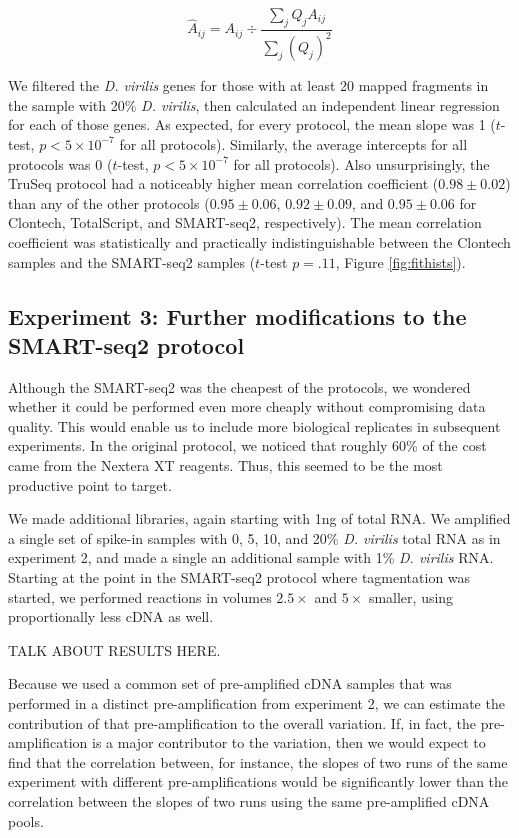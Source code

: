\begin{equation} \label{eqn:norm}
\hat{A}_{ij} = A_{ij} \div \frac{\sum_j Q_j A_{ij}}{\sum_j (Q_j)^2}  
\end{equation}



We filtered the {\em D. virilis} genes for those with at least 20 mapped fragments in the sample with 20\% {\em D. virilis}, then calculated an independent linear regression for each of those genes.  As expected, for every protocol, the mean slope was 1 ($t$-test, $p<5\times10^{-7}$ for all protocols).  Similarly, the average intercepts for all protocols was 0 ($t$-test, $p<5\times10^{-7}$ for all protocols).  Also unsurprisingly, the TruSeq protocol had a noticeably higher mean correlation coefficient ($0.98 \pm 0.02$) than any of the other protocols ($0.95 \pm 0.06$, $0.92\pm0.09$, and $0.95 \pm 0.06$ for Clontech, TotalScript, and SMART-seq2, respectively). The mean correlation coefficient was statistically and practically indistinguishable between the Clontech samples and the SMART-seq2 samples ($t$-test $p = .11$, Figure \ref{fig:fithists}).


\subsection{Experiment 3: Further modifications to the SMART-seq2 protocol}

Although the SMART-seq2 was the cheapest of the protocols, we wondered whether it could be performed even more cheaply without compromising data quality.  This would enable us to include more biological replicates in subsequent experiments.  In the original protocol, we noticed that roughly 60\% of the cost came from the Nextera XT reagents.  Thus, this seemed to be the most productive point to target.  

We made additional libraries, again starting with 1ng of total RNA.  We amplified a single set of spike-in samples with 0, 5, 10, and 20\% {\em D. virilis} total RNA as in experiment 2, and made a single an additional sample with 1\% {\em D. virilis} RNA. Starting at the point in the SMART-seq2 protocol where tagmentation was started, we performed reactions in volumes $2.5\times$ and $5\times$ smaller, using proportionally less cDNA as well.  

TALK ABOUT RESULTS HERE.

Because we used a common set of pre-amplified cDNA samples that was performed in a distinct pre-amplification from experiment 2, we can estimate the contribution of that pre-amplification to the overall variation. If, in fact, the pre-amplification is a major contributor to the variation, then we would expect to find that the correlation between, for instance, the slopes of two runs of the same experiment with different pre-amplifications would be significantly lower than the correlation between the slopes of two runs using the same pre-amplified cDNA pools. 